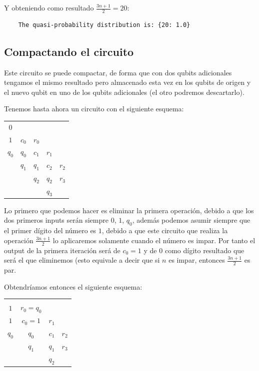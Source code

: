 Y obteniendo como resultado $\frac{3n+1}{2} = 20$:

\begin{verbatim}
    The quasi-probability distribution is: {20: 1.0}
\end{verbatim}



\subsection{Compactando el circuito}

Este circuito se puede compactar, de forma que con dos qubits adicionales tengamos el mismo resultado pero almacenado esta vez en los qubits de origen y el nuevo qubit en uno de los qubits adicionales (el otro podremos descartarlo).

Tenemos hasta ahora un circuito con el siguiente esquema:


\begin{center}
    \begin{tabular}{c|c|c|c|c}
        $0$     &       &       &       &       \\
        $1$     & $c_0$ & $r_0$ &       &       \\
        $q_0$   & $q_0$ & $c_1$ & $r_1$ &       \\
                & $q_1$ & $q_1$ & $c_2$ & $r_2$ \\
                &       & $q_2$ & $q_2$ & $r_3$ \\
                &       &       & $q_3$ &       \\
    \end{tabular}
\end{center}

Lo primero que podemos hacer es eliminar la primera operación, debido a que los dos primeros inputs serán siempre $0$, $1$, $q_0$, además podemos asumir siempre que el primer dígito del número es $1$, debido a que este circuito que realiza la operación $\frac{3n+1}{2}$ lo aplicaremos solamente cuando el número es impar. Por tanto el output de la primera iteración será de $c_0=1$ y de $0$ como dígito resultado que será el que eliminemos (esto equivale a decir que si $n$ es impar, entonces $\frac{3n+1}{2}$ es par.

Obtendríamos entonces el siguiente esquema:

\begin{center}
    \begin{tabular}{c|c|c|c}
                        &               &           &           \\
        $1$             &   $r_0=q_0$   &           &           \\
        $1$             &   $c_0=1$     &   $r_1$   &           \\
        $q_0$           &   $q_0$       &   $c_1$   &   $r_2$   \\
                        &   $q_1$       &   $q_1$   &   $r_3$   \\
                        &               &   $q_2$   &           \\
    \end{tabular}
\end{center}

